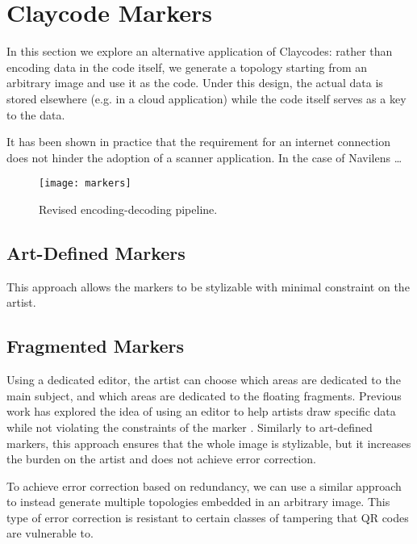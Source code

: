 \section{Claycode Markers}

In this section we explore an alternative application of Claycodes: rather than encoding data in the code itself, we generate a topology starting from an arbitrary image and use it as the code. Under this design, the actual data is stored elsewhere (e.g. in a cloud application) while the code itself serves as a key to the data.

It has been shown in practice that the requirement for an internet connection does not hinder the adoption of a scanner application. In the case of Navilens \cite{navilens} \dots

\begin{figure}[h]
    \caption{Revised encoding-decoding pipeline.}
    \centering
    \texttt{[image: markers]}
\end{figure}

\subsection[artDefined]{Art-Defined Markers}

This approach allows the markers to be stylizable with minimal constraint on the artist.

\subsection[fragments]{Fragmented Markers}

Using a dedicated editor, the artist can choose which areas are dedicated to the main subject, and which areas are dedicated to the floating fragments. Previous work has explored the idea of using an editor to help artists draw specific data while not violating the constraints of the marker \cite{intentionalEncoding}. Similarly to art-defined markers, this approach ensures that the whole image is stylizable, but it increases the burden on the artist and does not achieve error correction.

To achieve error correction based on redundancy, we can use a similar approach to instead generate multiple topologies embedded in an arbitrary image. This type of error correction is resistant to certain classes of tampering that QR codes are vulnerable to.
